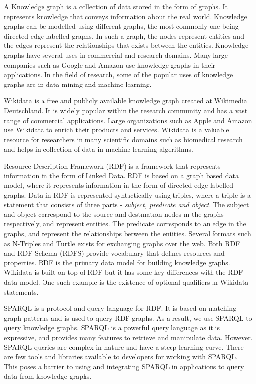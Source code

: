 \documentclass[12 pt, a4paper]{report}
\theoremstyle{definition}
\begin{document}
A Knowledge graph is a collection of data stored in the form of graphs. It represents knowledge that conveys information about the real world. Knowledge graphs can be modelled using different graphs, the most commonly one being directed-edge labelled graphs. In such a graph, the nodes represent entities and the edges represent the relationships that exists between the entities. Knowledge graphs have several uses in commercial and research domains. Many large companies such as Google and Amazon use knowledge graphs in their applications. In the field of research, some of the popular uses of knowledge graphs are in data mining and machine learning.

Wikidata is a free and publicly available knowledge graph created at Wikimedia Deutschland. It is widely popular within the research community and has a vast range of commercial applications. Large organizations such as Apple and Amazon use Wikidata to enrich their products and services. Wikidata is a valuable resource for researchers in many scientific domains such as biomedical research and helps in collection of data in machine learning algorithms.

Resource Description Framework (RDF) is a framework that represents information in the form of Linked Data. RDF is based on a graph based data model, where it represents information in the form of directed-edge labelled graphs. Data in RDF is represented syntactically using triples, where a triple is a statement that consists of three parts - \textit{subject, predicate and object}. The subject and object correspond to the source and destination nodes in the graphs respectively, and represent entities. The predicate corresponds to an edge in the graphs, and represent the relationships between the entities. Several formats such as N-Triples and Turtle exists for exchanging graphs over the web. Both RDF and RDF Schema (RDFS) provide vocabulary that defines resources and properties. RDF is the primary data model for building knowledge graphs. Wikidata is built on top of RDF but it has some key differences with the RDF data model. One such example is the existence of optional qualifiers in Wikidata statements. 

SPARQL is a protocol and query language for RDF. It is based on matching graph patterns and is used to query RDF graphs. As a result, we use SPARQL to query knowledge graphs. SPARQL is a powerful query language as it is expressive, and provides many features to retrieve and manipulate data. However, SPARQL queries are complex in nature and have a steep learning curve. There are few tools and libraries available to developers for working with SPARQL. This poses a barrier to using and integrating SPARQL in applications to query data from knowledge graphs.
\end{document}
